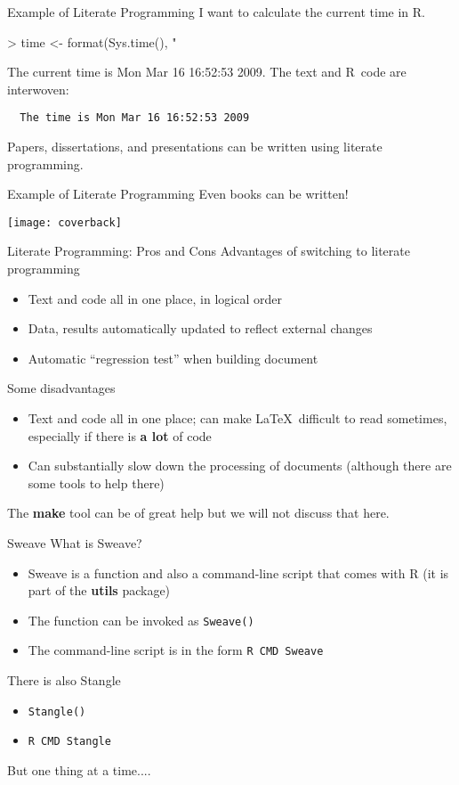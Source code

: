\documentclass{beamer}
\newcommand{\code}{\texttt}
\newcommand{\R}{\textsf{R}}
\newcommand{\pkg}{\textbf}
\begin{document}
\begin{frame}[fragile]{Example of Literate Programming}
I want to calculate the current time in \R.
\begin{Schunk}
\begin{Sinput}
> time <- format(Sys.time(), "%a %b %d %X %Y")
\end{Sinput}
\end{Schunk}
The current time is Mon Mar 16 16:52:53 2009.  The text and \R\ code are
interwoven:
\begin{verbatim}
  The time is Mon Mar 16 16:52:53 2009
\end{verbatim}
Papers, dissertations, and presentations can be written using literate
programming.
\end{frame}

\begin{frame}{Example of Literate Programming}
  Even books can be written!
  \begin{center}
    \texttt{[image: coverback]}
    \end{center}
  \end{frame}

\begin{frame}{Literate Programming: Pros and Cons}
Advantages of switching to literate programming
\begin{itemize}
\item Text and code all in one place, in logical order
\item Data, results automatically updated to reflect external changes
\item Automatic ``regression test'' when building document
\end{itemize}
Some disadvantages
\begin{itemize}
\item Text and code all in one place; can make \LaTeX\ difficult to
  read sometimes, especially if there is \textbf{a lot} of code
\item Can substantially slow down the processing of documents
  (although there are some tools to help there)
\end{itemize}
The \textbf{make} tool can be of great help but we will not discuss
that here.
\end{frame}

\begin{frame}{Sweave}
What is Sweave?
\begin{itemize}
\item Sweave is a function and also a command-line script that comes
  with R (it is part of the \pkg{utils} package)
\item The function can be invoked as \code{Sweave()}
\item The command-line script is in the form \code{R CMD Sweave}
\end{itemize}
There is also Stangle
\begin{itemize}
\item \code{Stangle()}
\item \code{R CMD Stangle}
\end{itemize}
But one thing at a time....
\end{frame}
\end{document}
